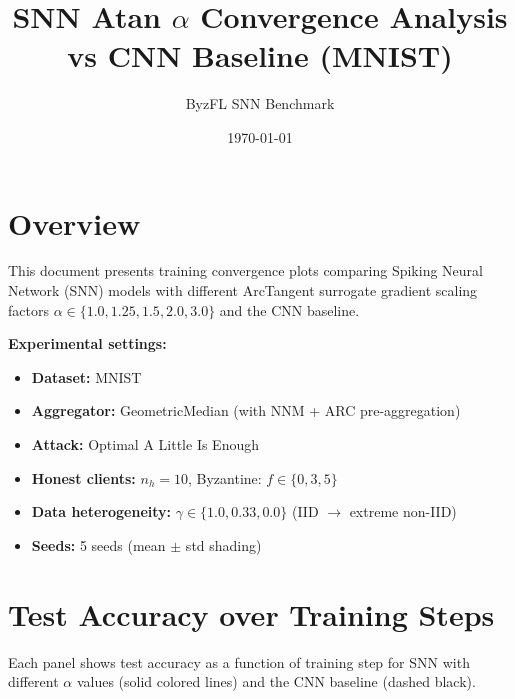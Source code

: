 \documentclass{article}
\title{SNN Atan $\alpha$ Convergence Analysis\\vs CNN Baseline (MNIST)}
\author{ByzFL SNN Benchmark}
\date{\today}
\begin{document}
\maketitle

\section{Overview}
This document presents training convergence plots comparing Spiking Neural Network (SNN) models with different ArcTangent surrogate gradient scaling factors $\alpha \in \{1.0, 1.25, 1.5, 2.0, 3.0\}$ and the CNN baseline.

\textbf{Experimental settings:}
\begin{itemize}
    \item \textbf{Dataset:} MNIST
    \item \textbf{Aggregator:} GeometricMedian (with NNM + ARC pre-aggregation)
    \item \textbf{Attack:} Optimal A Little Is Enough
    \item \textbf{Honest clients:} $n_h = 10$, Byzantine: $f \in \{0, 3, 5\}$
    \item \textbf{Data heterogeneity:} $\gamma \in \{1.0, 0.33, 0.0\}$ (IID $\to$ extreme non-IID)
    \item \textbf{Seeds:} 5 seeds (mean $\pm$ std shading)
\end{itemize}


\newpage
\section{Test Accuracy over Training Steps}
Each panel shows test accuracy as a function of training step for SNN with different $\alpha$ values (solid colored lines) and the CNN baseline (dashed black).
\end{document}
